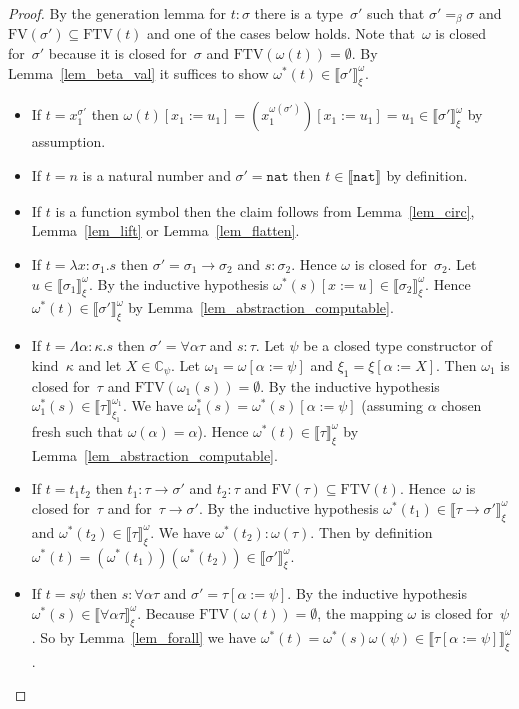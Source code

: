 \documentclass[a4paper,UKenglish,cleveref,autoref,numberwithinsect]{lipics-v2019}
\theoremstyle{definition}
\newcommand{\arrtype}{\rightarrow}
\newcommand{\subst}[2]{#1:=#2}
\newcommand{\abs}[2]{\lambda #1.#2}
\newcommand{\tabs}[2]{\Lambda #1.#2}
\newcommand{\nat}{\mathtt{nat}}
\newcommand{\FTV}{\mathrm{FTV}}
\newcommand{\FV}{\mathrm{FV}}
\newcommand{\Cb}{\mathbb{C}}
\newcommand{\val}[3]{\ensuremath{\llbracket#1\rrbracket_{#2}^{#3}}}
\begin{document}
\begin{proof}
  By the generation lemma for $t : \sigma$ there is a type~$\sigma'$
  such that $\sigma' =_\beta \sigma$ and $\FV(\sigma') \subseteq
  \FTV(t)$ and one of the cases below holds. Note that~$\omega$ is
  closed for~$\sigma'$ because it is closed for~$\sigma$ and
  $\FTV(\omega(t)) = \emptyset$. By Lemma~\ref{lem_beta_val} it
  suffices to show $\omega^*(t) \in \val{\sigma'}{\xi}{\omega}$.
  \begin{itemize}
  \item If $t = x_1^{\sigma'}$ then $\omega(t)[\subst{x_1}{u_1}] =
    (x_1^{\omega(\sigma')})[\subst{x_1}{u_1}] = u_1 \in
    \val{\sigma'}{\xi}{\omega}$ by assumption.
  \item If $t = n$ is a natural number and $\sigma' = \nat$ then $t
    \in \val{\nat}{}{}$ by definition.
  \item If $t$ is a function symbol then the claim follows from
    Lemma~\ref{lem_circ}, Lemma~\ref{lem_lift} or
    Lemma~\ref{lem_flatten}.
  \item If $t = \abs{x:\sigma_1}{s}$ then
    $\sigma' = \sigma_1\arrtype\sigma_2$ and $s : \sigma_2$. Hence
    $\omega$ is closed for~$\sigma_2$. Let
    $u \in \val{\sigma_1}{\xi}{\omega}$. By the inductive hypothesis
    $\omega^*(s)[\subst{x}{u}] \in \val{\sigma_2}{\xi}{\omega}$. Hence
    $\omega^*(t) \in \val{\sigma'}{\xi}{\omega}$ by
    Lemma~\ref{lem_abstraction_computable}.
  \item If $t = \tabs{\alpha:\kappa}{s}$ then $\sigma' =
    \forall\alpha\tau$ and $s : \tau$. Let $\psi$ be a closed type
    constructor of kind~$\kappa$ and let $X \in \Cb_\psi$. Let
    $\omega_1 = \omega[\subst{\alpha}{\psi}]$ and
    $\xi_1=\xi[\subst{\alpha}{X}]$. Then $\omega_1$ is closed
    for~$\tau$ and $\FTV(\omega_1(s)) = \emptyset$. By the inductive
    hypothesis $\omega_1^*(s) \in \val{\tau}{\xi_1}{\omega_1}$. We
    have $\omega_1^*(s) = \omega^*(s)[\subst{\alpha}{\psi}]$ (assuming
    $\alpha$ chosen fresh such that $\omega(\alpha) = \alpha$). Hence
    $\omega^*(t) \in \val{\tau}{\xi}{\omega}$ by
    Lemma~\ref{lem_abstraction_computable}.
  \item If $t = t_1 t_2$ then $t_1 : \tau\arrtype\sigma'$ and $t_2 :
    \tau$ and $\FV(\tau) \subseteq \FTV(t)$. Hence~$\omega$ is closed
    for~$\tau$ and for~$\tau\arrtype\sigma'$. By the inductive
    hypothesis $\omega^*(t_1) \in
    \val{\tau\arrtype\sigma'}{\xi}{\omega}$ and $\omega^*(t_2) \in
    \val{\tau}{\xi}{\omega}$. We have $\omega^*(t_2) :
    \omega(\tau)$. Then by definition $\omega^*(t) =
    (\omega^*(t_1))(\omega^*(t_2)) \in \val{\sigma'}{\xi}{\omega}$.
  \item If $t = s \psi$ then $s : \forall\alpha\tau$ and $\sigma' =
    \tau[\subst{\alpha}{\psi}]$. By the inductive hypothesis
    $\omega^*(s) \in \val{\forall\alpha\tau}{\xi}{\omega}$. Because
    $\FTV(\omega(t)) = \emptyset$, the mapping $\omega$ is closed
    for~$\psi$. So by Lemma~\ref{lem_forall} we have $\omega^*(t) =
    \omega^*(s) \omega(\psi) \in
    \val{\tau[\subst{\alpha}{\psi}]}{\xi}{\omega}$.\qedhere
  \end{itemize}
\end{proof}
\end{document}
